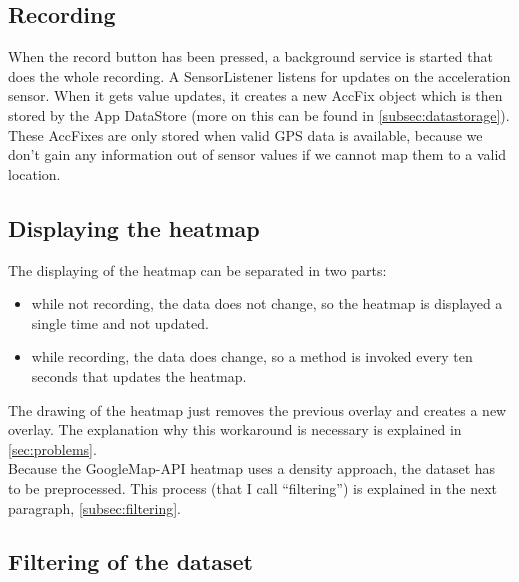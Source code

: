 \documentclass[10pt,a4paper]{article} %
\begin{document}
	\subsection{Recording}

	When the record button has been pressed, a background service is started that does the whole recording.
	A SensorListener listens for updates on the acceleration sensor.
	When it gets value updates, it creates a new AccFix object which is then stored by the App DataStore (more on this can be found in \autoref{subsec:datastorage}).
	These AccFixes are only stored when valid GPS data is available, because we don't gain any information out of sensor values if we cannot map them to a valid location.
	
	
	\subsection{Displaying the heatmap}\label{subsec:displayheatmap}
	The displaying of the heatmap can be separated in two parts:

	\begin{itemize}
		\item while not recording, the data does not change, so the heatmap is displayed a single time and not updated.
		\item while recording, the data does change, so a method is invoked every ten seconds that updates the heatmap. 
	\end{itemize}

	The drawing of the heatmap just removes the previous overlay and creates a new overlay.
	The explanation why this workaround is necessary is explained in \autoref{sec:problems}.\\
	Because the GoogleMap-API heatmap uses a density approach, the dataset has to be preprocessed.
	This process (that I call ``filtering'') is explained in the next paragraph,  \autoref{subsec:filtering}.
	
	\subsection{Filtering of the dataset}\label{subsec:filtering}
\end{document}
